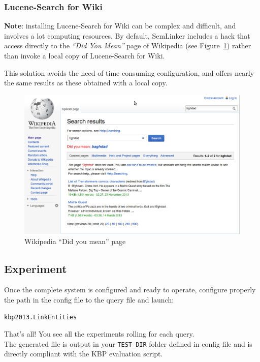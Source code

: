 \documentclass[11pt]{article}
\newcommand{\seml}{SemLinker}
\begin{document}
\subsubsection{Lucene-Search for Wiki}
\label{sssec:lucsrch}
\textbf{Note}: installing Lucene-Search for Wiki can be complex and difficult, and involves a lot computing resources. 
By default, \seml{} includes a hack that access directly to the \textit{``Did You Mean''} page of Wikipedia (see Figure~\ref{fig:didumean}) rather than invoke a local copy of Lucene-Search for Wiki. 

This solution avoids the need of time consuming configuration, and offers nearly the same results as these obtained with a local copy. 

\begin{figure}
\begin{center}
  \includegraphics[width=\textwidth]{wikipedia_didumean}
  \caption{Wikipedia ``Did you mean'' page}
  \label{fig:didumean}
\end{center}
\end{figure}

\subsection{Experiment}
Once the complete system is configured and ready to operate, configure properly the path in the config file to the query file and launch:
\begin{lstlisting}
kbp2013.LinkEntities
\end{lstlisting}

That's all! You see all the experiments rolling for each query.\\

The generated file is output in your \texttt{TEST\_DIR} folder defined in config file and is directly compliant with the KBP evaluation script. \\
\end{document}

